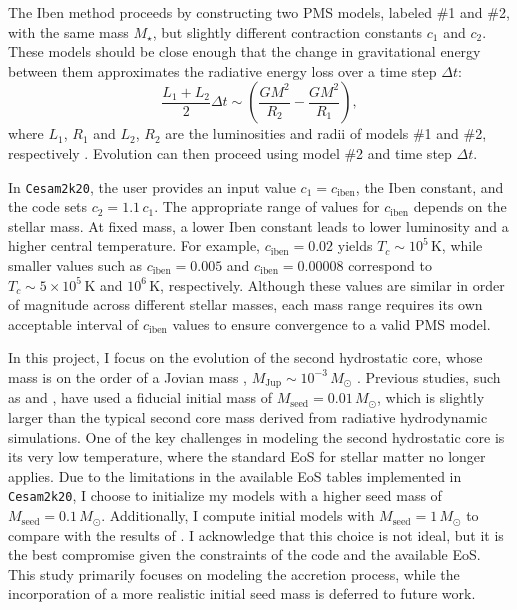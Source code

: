 \documentclass[12pt,a4paper]{article}
\newcommand{\mr}{\mathrm}
\begin{document}
The Iben method proceeds by constructing two PMS models, labeled \#1 and \#2, with the same mass $M_\star$, but slightly different contraction constants $c_1$ and $c_2$. These models should be close enough that the change in gravitational energy between them approximates the radiative energy loss over a time step $\Delta t$:
\begin{equation}
  \frac{L_1 + L_2}{2}\Delta t \sim \left(\frac{GM^2}{R_2} - \frac{GM^2}{R_1}\right),
\end{equation}
where $L_1$, $R_1$ and $L_2$, $R_2$ are the luminosities and radii of models \#1 and \#2, respectively \parencite[cf. Eq.~(13)][]{Morel1997}. Evolution can then proceed using model \#2 and time step $\Delta t$.

In \texttt{Cesam2k20}, the user provides an input value $c_1 = c_\mr{iben}$, the Iben constant, and the code sets $c_2 = 1.1\,c_1$. The appropriate range of values for $c_\mr{iben}$ depends on the stellar mass. At fixed mass, a lower Iben constant leads to lower luminosity and a higher central temperature. For example, $c_\mr{iben} = 0.02$ yields $T_c \sim 10^5\,\mr{K}$, while smaller values such as $c_\mr{iben} = 0.005$ and $c_\mr{iben} = 0.00008$ correspond to $T_c \sim 5 \times 10^5\,\mr{K}$ and $10^6\,\mr{K}$, respectively. Although these values are similar in order of magnitude across different stellar masses, each mass range requires its own acceptable interval of $c_\mr{iben}$ values to ensure convergence to a valid PMS model.  

In this project, I focus on the evolution of the second hydrostatic core, whose mass is on the order of a Jovian mass , $M_\mr{Jup} \sim 10^{-3}\,M_\odot$ \parencite[e.g.,][]{VaytetEtAl2013}. Previous studies, such as \textcite{KunitomoEtAl2017} and \textcite{AmardMatt2023}, have used a fiducial initial mass of $M_\mr{seed} = 0.01\,M_\odot$, which is slightly larger than the typical second core mass derived from radiative hydrodynamic simulations. One of the key challenges in modeling the second hydrostatic core is its very low temperature, where the standard EoS for stellar matter no longer applies. Due to the limitations in the available EoS tables implemented in \texttt{Cesam2k20}, I choose to initialize my models with a higher seed mass of $M_\mr{seed} = 0.1\,M_\odot$. Additionally, I compute initial models with $M_\mr{seed} = 1\,M_\odot$ to compare with the results of \textcite{PallaStahler1993}. I acknowledge that this choice is not ideal, but it is the best compromise given the constraints of the code and the available EoS. This study primarily focuses on modeling the accretion process, while the incorporation of a more realistic initial seed mass is deferred to future work.
\end{document}
